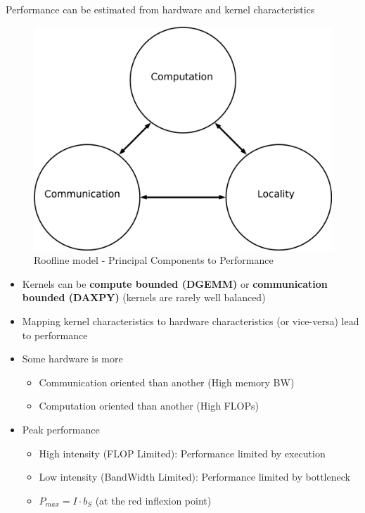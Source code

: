 \documentclass{article}
\begin{document}
Performance can be estimated from hardware and kernel characteristics
\begin{figure}[!htp]
    \centering
    \includegraphics[width=.4\textwidth, height=.3\textwidth]{Roofline_4.png}
    \caption{Roofline model - Principal Components to Performance}
    \label{Roofline_4}
\end{figure}
\begin{itemize}
\item Kernels can be \textbf{compute bounded (DGEMM)} or \textbf{communication bounded (DAXPY)} (kernels are rarely well balanced)
\item Mapping kernel characteristics to hardware characteristics (or vice-versa) lead to performance
\item Some hardware is more 
\begin{itemize}
\item Communication oriented than another (High memory BW)
\item Computation oriented than another (High FLOPs)
\end{itemize}
\item Peak performance
\begin{itemize}
\item High intensity (FLOP Limited): Performance limited by execution
\item Low intensity (BandWidth Limited): Performance limited by bottleneck
\item $P_{max} = I \cdot b_{S}$ (at the red inflexion point)
\end{itemize}
\end{itemize}
\end{document}
